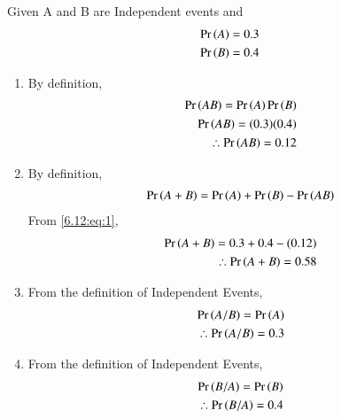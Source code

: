 Given A and B are Independent events and 
\begin{align}
\Pr\left(A\right) = 0.3 \\
\Pr\left(B\right) = 0.4
\end{align}
\begin{enumerate}
\item By definition,
\begin{align}
\Pr\left(AB\right) = \Pr\left(A\right)\Pr\left(B\right) \\
\Pr\left(AB\right) = (0.3)(0.4) \\
\therefore \Pr\left(AB\right) = 0.12 \label{6.12:eq:1}
\end{align}
\item By definition,
\begin{align}
\Pr\left(A + B\right) = \Pr\left(A\right) + \Pr\left(B\right) - \Pr\left(AB\right)
\end{align}
From \eqref{6.12:eq:1}, 
\begin{align}
\Pr\left(A + B\right) = 0.3 + 0.4 - (0.12) \\
\therefore \Pr\left(A + B\right) = 0.58
\end{align}
\item From the definition of Independent Events,
\begin{align}
\Pr\left(A/B\right) = \Pr\left(A\right) \\
\therefore \Pr\left(A/B\right) = 0.3 
\end{align}
\item From the definition of Independent Events,
\begin{align}
\Pr\left(B/A\right) = \Pr\left(B\right) \\
\therefore \Pr\left(B/A\right) = 0.4
\end{align}
\end{enumerate}